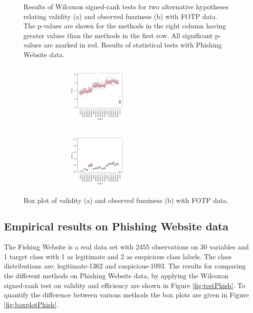 \documentclass[main]{subfiles}
\begin{document}
\begin{figure}[h]
\begin{subfigure}{.5\textwidth}
\end{subfigure}%
\caption{Results of Wilcoxon signed-rank tests for two alternative hypotheses relating validity (a) and observed fuzziness (b) with FOTP data. The p-values are shown for the methods in the right column having greater values than the methods in the first row. All significant p-values are marked in red. Results of statistical tests with Phishing Website data.} \label{fig:testFotp}
\end{figure}

\begin{figure}[h]
\centering
\begin{subfigure}{.5\textwidth}
  \centering
  \includegraphics[width=6cm,height=3cm]{images/boxplotFotp}
\end{subfigure}%
\begin{subfigure}{.5\textwidth}
  \centering
  \includegraphics[width=6cm,height=3cm]{images/boxplotFotp_eff}
\end{subfigure}%
\caption{Box plot of validity (a) and observed fuzziness (b) with FOTP data.} \label{fig:boxplotFotp}
\end{figure}

\subsection{Empirical results on Phishing Website data}
The Fishing Website is a real data set with 2455 observations  on 30 variables and 1 target class with 1 as legitimate and 2 as suspicious class labels.  The class distributions are: legitimate-1362 and suspicious-1093. The results for comparing the different methods on Phishing Website data, by applying the Wilcoxon signed-rank test on validity and efficiency are shown in Figure \ref{fig:testPhish}. To quantify the difference between various methods the box plots are given in Figure \ref{fig:boxplotPhish}.
\end{document}
